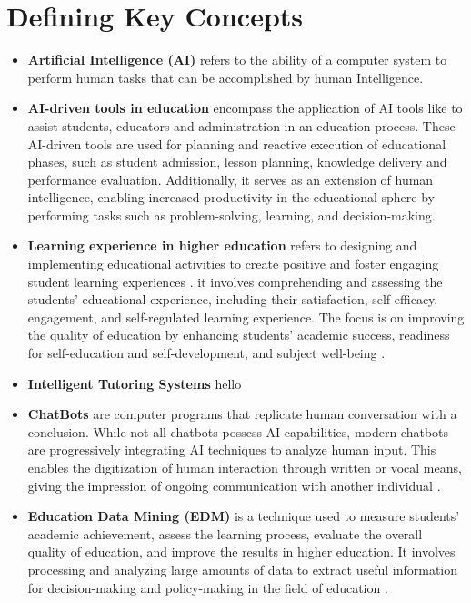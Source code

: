 \section{Defining Key Concepts}\label{sec:defining-key-concepts}
\begin{itemize}
	\item \textbf{Artificial Intelligence (AI)}\label{AI} refers to the ability of a computer system to perform human
	tasks that can be accomplished by human Intelligence\citep{sadiku_ai_2021}.
	\item \textbf{AI-driven tools in education} encompass the application of AI tools like  to assist 
	students, educators and administration in an education process.
	These AI-driven tools are used for planning and reactive execution of educational phases, such as
	student admission, lesson planning, knowledge delivery and performance evaluation\citep{mallik_proactive_2023}.
	Additionally, it serves as an extension of human intelligence, enabling
	increased productivity in the educational sphere by performing tasks
	such as problem-solving, learning, and decision-making\citep{cheng_widespread_2023}.
	\item \textbf{Learning experience in higher education}  refers to designing and implementing educational activities to create 
	positive and foster engaging student learning experiences \citep{kang_supporting_2023}.
	it involves comprehending and assessing the students’ educational experience, including 
	their satisfaction, self-efficacy, engagement, and self-regulated learning experience\citep{lyz_students_2022}.
	The focus is on improving the quality of education by enhancing students’ academic success, 
	readiness for self-education and self-development, and subject well-being \citep{iordache-platis_building_2018}.
	\item \textbf{Intelligent Tutoring Systems}
	hello
	\item \textbf{ ChatBots }\label{chatbot} are computer programs that replicate human conversation with a conclusion. 
	While not all chatbots possess AI capabilities, modern chatbots are progressively 
	integrating AI techniques to analyze human input\citep{IBM_withnodate}.
	This enables the digitization of human interaction through written 
	or vocal means, giving the impression of ongoing communication with another individual \citep{oracle_what_nodate}.
	\item \textbf{Education Data Mining (EDM)}  is a technique used to measure students' academic achievement, 
	assess the learning process, evaluate the overall quality of education, and improve the results in higher education.
	It involves processing and analyzing large amounts of data to extract useful 
	information for decision-making and policy-making in the field of education \citep{arifin_using_2022}.
\end{itemize}
